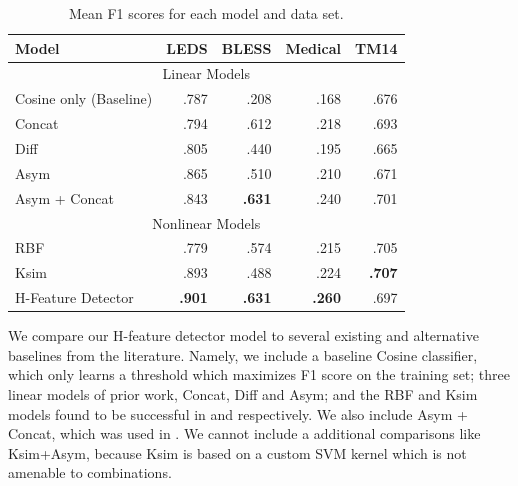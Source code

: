 \documentclass[12pt]{article}
\begin{document}
\begin{table}
\centering
\begin{small}
\begin{tabular}{|l|rrrr|}
  \hline
  Model            &      LEDS   &      BLESS  &      Medical  &      TM14   \\
  \hline
  \hline
  \multicolumn{5}{|c|}{Linear Models}\\
  \hline
  Cosine only (Baseline)              &      .787   &      .208   &      .168     &      .676   \\
  Concat                              &      .794   &      .612   &      .218     &      .693   \\
  Diff \cite{weeds:2014:coling}       &      .805   &      .440   &      .195     &      .665   \\
  Asym \cite{roller:2014:coling}      &      .865   &      .510   &      .210     &      .671   \\
  Asym + Concat \cite{beltagy:2016:cl}&      .843   &  {\bf.631}  &      .240     &      .701   \\
  \hline
  \multicolumn{5}{|c|}{Nonlinear Models}\\
  \hline
  RBF                                         &      .779   &      .574   &      .215     &      .705   \\
  Ksim \cite{levy:2014:conll}                 &      .893   &      .488   &      .224     &  {\bf.707}  \\
  H-Feature Detector \cite{roller:2016:emnlp} &  {\bf.901}  &  {\bf.631}  &  {\bf.260}    &      .697   \\
  \hline
\end{tabular}
\end{small}
\caption{Mean F1 scores for each model and data set.}
\label{tab:hfeatureresults}
\end{table}

We compare our H-feature detector model to several existing and alternative
baselines from the literature. Namely, we include a baseline Cosine classifier,
which only learns a threshold which maximizes F1 score on the training set;
three linear models of prior work, Concat, Diff and Asym; and the RBF and Ksim
models found to be successful in  and
 respectively. We also include
Asym + Concat, which was used in . We cannot include a
additional comparisons like Ksim+Asym, because Ksim is based on a custom SVM
kernel which is not amenable to combinations.
\end{document}
